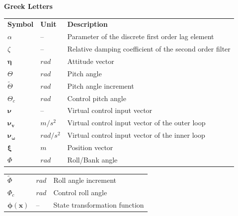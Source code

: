 \documentclass[11pt, a4paper, twoside]{report}
\begin{document}
\textbf{Greek Letters}
\begin{table}[H]
  \begin{tabular}{p{2.5cm} p{1.5cm} p{10cm}} 
    \textbf{Symbol} & \textbf{Unit} & \textbf{Description} \\ [1.2ex] 
    $\alpha$ & -- & Parameter of the discrete first order lag element \\ 
    $\zeta$ & -- & Relative damping coefficient of the second order filter \\
    $\bm{\eta}$ & $rad$ & Attitude vector \\
    $\Theta$ & $rad$ & Pitch angle \\
    $\tilde{\Theta}$ & $rad$ & Pitch angle increment \\
    $\Theta_c$ & $rad$ & Control pitch angle \\
    $\bm{\nu}$ & -- & Virtual control input vector \\
    $\bm{\nu}_{\bm{\dot{v}}}$ & $m/s^2$ & Virtual control input vector of the outer loop \\
    $\bm{\nu}_{\bm{\dot{\omega}}}$ & $rad/s^2$ & Virtual control input vector of the inner loop \\
    $\bm{\xi}$ & $m$ & Position vector \\
    $\Phi$ & $rad$ & Roll/Bank angle \\ %
  \end{tabular}
  \captionsetup{font=bf, belowskip=-0.5cm}
  \label{table:tab_greek_1}
\end{table}


\begin{table}[H]
  \begin{tabular}{p{2.5cm} p{1.5cm} p{10cm}} 
    $\tilde{\Phi}$ & $rad$ & Roll angle increment \\
    $\Phi_c$ & $rad$ & Control roll angle \\
	$\bm{\phi}(\bm{x})$ & -- & State transformation function %
  \end{tabular}
  \captionsetup{font=bf, belowskip=-0.5cm}
  \label{table:tab_greek_2}
\end{table}
\end{document}
